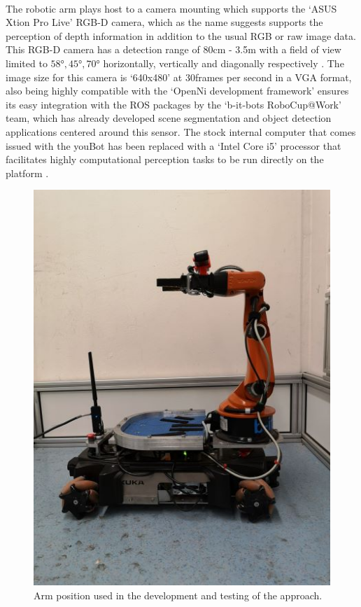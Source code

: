 \paragraph{}The robotic arm plays host to a camera mounting which supports the `ASUS Xtion Pro Live' RGB-D camera, which as the name suggests supports the perception of depth information in addition to the usual RGB or raw image data. This RGB-D camera has a detection range of 80cm - 3.5m with a field of view limited to $\ang{58}, \ang{45}, \ang{70}$ horizontally, vertically and diagonally respectively \cite{swoboda2014comprehensive}. The image size for this camera is `640x480' at 30frames per second in a VGA format, also being highly compatible with the `OpenNi development framework' ensures its easy integration with the ROS packages by the `b-it-bots RoboCup@Work' team, which has already developed scene segmentation and object detection applications centered around this sensor. The stock internal computer that comes issued with the youBot has been replaced with a `Intel Core i5' processor that facilitates highly computational perception tasks to be run directly on the platform \cite{Roscoe2012}. 

\begin{figure}[h]
	\centering
	\includegraphics[scale=0.5]{images/arm_config_l}
	\caption{Arm position used in the development and testing of the approach.}
	\label{fig:youbotarm}
\end{figure}

